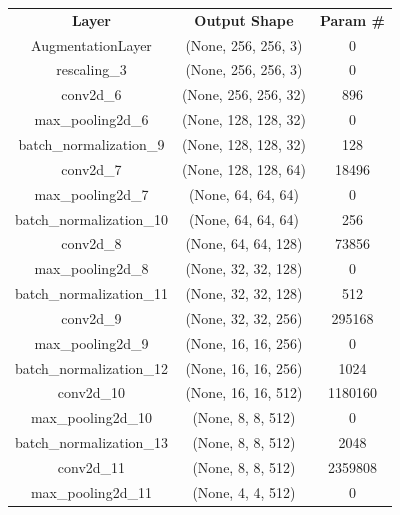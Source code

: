 \begin{table}[h]
	\centering
	\begin{tabular}{ccc}
	\hline
	\textbf{Layer}                & \textbf{Output Shape}      & \textbf{Param \#}    \\ 
	AugmentationLayer             & (None, 256, 256, 3)       & 0                    \\ 
	rescaling\_3                  & (None, 256, 256, 3)       & 0                    \\ 
	conv2d\_6                     & (None, 256, 256, 32)      & 896                  \\ 
	max\_pooling2d\_6             & (None, 128, 128, 32)      & 0                    \\ 
	batch\_normalization\_9       & (None, 128, 128, 32)      & 128                  \\ 
	conv2d\_7                     & (None, 128, 128, 64)      & 18496                \\ 
	max\_pooling2d\_7             & (None, 64, 64, 64)        & 0                    \\ 
	batch\_normalization\_10      & (None, 64, 64, 64)        & 256                  \\ 
	conv2d\_8                     & (None, 64, 64, 128)       & 73856                \\ 
	max\_pooling2d\_8             & (None, 32, 32, 128)       & 0                    \\ 
	batch\_normalization\_11      & (None, 32, 32, 128)       & 512                  \\ 
	conv2d\_9                     & (None, 32, 32, 256)       & 295168               \\ 
	max\_pooling2d\_9             & (None, 16, 16, 256)       & 0                    \\ 
	batch\_normalization\_12      & (None, 16, 16, 256)       & 1024                 \\ 
	conv2d\_10                    & (None, 16, 16, 512)       & 1180160              \\ 
	max\_pooling2d\_10            & (None, 8, 8, 512)         & 0                    \\ 
	batch\_normalization\_13      & (None, 8, 8, 512)         & 2048                 \\ 
	conv2d\_11                    & (None, 8, 8, 512)         & 2359808              \\ 
	max\_pooling2d\_11            & (None, 4, 4, 512)         & 0                    \\ 

\end{tabular}
\end{table}

